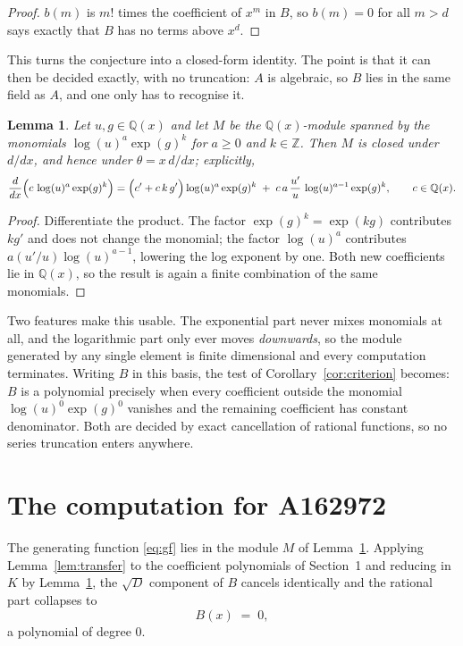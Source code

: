 \documentclass[11pt,a4paper]{article}
\theoremstyle{plain}
\newtheorem{lemma}[theorem]{Lemma}
\theoremstyle{definition}
\begin{document}
\begin{proof}
$b(m)$ is $m!$ times the coefficient of $x^{m}$ in $B$, so $b(m)=0$ for all $m>d$ says
exactly that $B$ has no terms above $x^{d}$.
\end{proof}

This turns the conjecture into a closed-form identity. The point is that it can then be
decided exactly, with no truncation: $A$ is algebraic, so $B$ lies in the same field as
$A$, and one only has to recognise it.

\begin{lemma}\label{lem:field}
Let $u,g\in\mathbb{Q}(x)$ and let $M$ be the $\mathbb{Q}(x)$-module spanned by the
monomials $\log(u)^{a}\exp(g)^{k}$ for $a\ge0$ and $k\in\mathbb{Z}$. Then $M$ is closed
under $d/dx$, and hence under $\theta=x\,d/dx$; explicitly,
\[
\frac{d}{dx}\Bigl(c\,\log(u)^{a}\exp(g)^{k}\Bigr)
=\Bigl(c'+c\,k\,g'\Bigr)\log(u)^{a}\exp(g)^{k}
\;+\;c\,a\,\frac{u'}{u}\,\log(u)^{a-1}\exp(g)^{k},
\qquad c\in\mathbb{Q}(x).
\]
\end{lemma}

\begin{proof}
Differentiate the product. The factor $\exp(g)^{k}=\exp(kg)$ contributes $kg'$ and does
not change the monomial; the factor $\log(u)^{a}$ contributes $a(u'/u)\log(u)^{a-1}$,
lowering the log exponent by one. Both new coefficients lie in $\mathbb{Q}(x)$, so the
result is again a finite combination of the same monomials.
\end{proof}

Two features make this usable. The exponential part never mixes monomials at all, and the
logarithmic part only ever moves \emph{downwards}, so the module generated by any single
element is finite dimensional and every computation terminates. Writing $B$ in this basis,
the test of Corollary~\ref{cor:criterion} becomes: $B$ is a polynomial precisely when every
coefficient outside the monomial $\log(u)^{0}\exp(g)^{0}$ vanishes and the remaining
coefficient has constant denominator. Both are decided by exact cancellation of rational
functions, so no series truncation enters anywhere.

\section{The computation for A162972}

The generating function \eqref{eq:gf} lies in the module $M$ of
Lemma~\ref{lem:field}.
Applying Lemma~\ref{lem:transfer} to the coefficient polynomials of Section~1 and reducing
in $K$ by Lemma~\ref{lem:field}, the $\sqrt{D}$ component of $B$ cancels identically and
the rational part collapses to
\[
B(x)\;=\;0 ,
\]
a polynomial of degree $0$.
\end{document}
